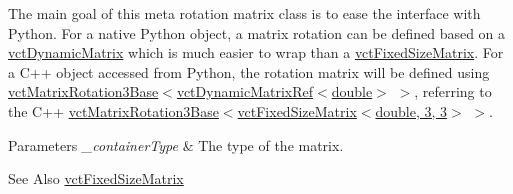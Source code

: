 The main goal of this meta rotation matrix class is to ease the interface with Python. For a native Python object, a matrix rotation can be defined based on a \hyperlink{classvct_dynamic_matrix}{vct\-Dynamic\-Matrix} which is much easier to wrap than a \hyperlink{classvct_fixed_size_matrix}{vct\-Fixed\-Size\-Matrix}. For a C++ object accessed from Python, the rotation matrix will be defined using \hyperlink{classvct_matrix_rotation3_base}{vct\-Matrix\-Rotation3\-Base}$<$\hyperlink{classvct_dynamic_matrix_ref}{vct\-Dynamic\-Matrix\-Ref$<$double$>$} $>$, referring to the C++ \hyperlink{classvct_matrix_rotation3_base}{vct\-Matrix\-Rotation3\-Base}$<$\hyperlink{classvct_fixed_size_matrix}{vct\-Fixed\-Size\-Matrix$<$double, 3, 3$>$} $>$.


\begin{DoxyParams}{Parameters}
{\em \-\_\-container\-Type} & The type of the matrix.\\
\hline
\end{DoxyParams}
\begin{DoxySeeAlso}{See Also}
\hyperlink{classvct_fixed_size_matrix}{vct\-Fixed\-Size\-Matrix} 
\end{DoxySeeAlso}


